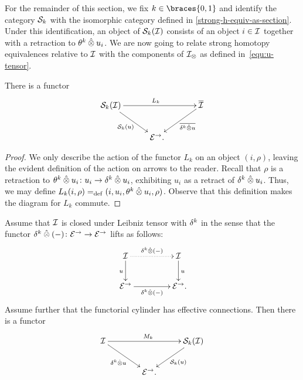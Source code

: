 \documentclass[reqno,10pt,a4paper,oneside,draft]{amsart}
\begin{document}
For the remainder of this section, we fix $k \in \braces{0, 1}$ and identify the category $\cal{S}_k$ with the isomorphic category defined in \cref{strong-h-equiv-as-section}.
Under this identification, an object of $\cal{S}_k(\cal{I})$ consists of an object $i \in \cal{I}$ together with a retraction to $\thetak \hatotimes u_i$.
We are now going to relate strong homotopy equivalences relative to $\cal{I}$ with the components of $\cal{I}_\otimes$ as defined in~\eqref{equ:u-tensor}.

\begin{lemma} \label{lem:from-strong-hequiv}
There is a functor
\[
\xymatrix@!C{
  \cal{S}_k(\cal{I})
  \ar[dr]_{\cal{S}_k(u)}
  \ar[rr]^{L_k}
&&
  \overline{\cal{I}}
  \ar[dl]^-{\overline{\kcyl \hatotimes u}}
\\&
  \catE^\to
\rlap{.}}
\]
\end{lemma}

\begin{proof}
We only describe the action of the functor $L_k$ on an object $(i, \rho)$, leaving the evident definition of the action on arrows to the reader.
Recall that $\rho$ is a retraction to $\thetak \hatotimes u_i \co u_i \to \kcyl \hatotimes u_i$, exhibiting $u_i$ as a retract of $\kcyl \hatotimes u_i$.
Thus, we may define $L_k(i, \rho) \defeq (i, u_i, \thetak \hatotimes u_i, \rho)$.
Observe that this definition makes the diagram for $L_k$ commute.
\end{proof}

\begin{lemma} \label{lem:to-strong-hequiv}
Assume that $\cal{I}$ is closed under Leibniz tensor with $\kcyl$ in the sense that the functor $\kcyl \hatotimes (-) \co \catE^\to \to \catE^\to$ lifts as follows:
\begin{equation}
\label{to-strong-hequiv:0}
\begin{gathered}
\xymatrix@C+2em{
  \cal{I}
  \ar[d]_{u}
  \ar@{.>}[r]^{\kcyl \hatotimes (-)}
&
  \cal{I}
  \ar[d]^{u}
\\
  \catE^\to
  \ar[r]_{\kcyl \hatotimes (-)}
&
  \catE^\to
\rlap{.}}
\end{gathered}
\end{equation}
Assume further that the functorial cylinder has effective connections.
Then there is a functor
\[
\xymatrix@!C{
  \cal{I}
  \ar[dr]_{\kcyl \hatotimes u} \ar[rr]^{M_k}
&&
  \cal{S}_k(\cal{I})
  \ar[dl]^{\cal{S}_k(u)}
\\&
   \catE^\to
\rlap{.}}
\]
\end{lemma}
\end{document}
